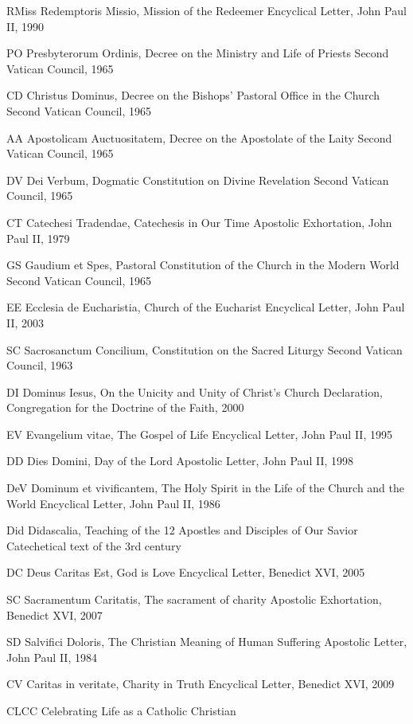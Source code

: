 \documentclass[oneside]{book}
\begin{document}
RMiss    Redemptoris Missio, Mission of the Redeemer
    Encyclical Letter, John Paul II, 1990

PO    Presbyterorum Ordinis, Decree on the Ministry and Life of Priests
    Second Vatican Council, 1965

CD    Christus Dominus, Decree on the Bishops' Pastoral Office
      in the Church
    Second Vatican Council, 1965

AA    Apostolicam Auctuositatem, Decree on the Apostolate of the Laity
    Second Vatican Council, 1965


DV    Dei Verbum, Dogmatic Constitution on Divine Revelation
    Second Vatican Council, 1965

CT    Catechesi Tradendae, Catechesis in Our Time
    Apostolic Exhortation, John Paul II, 1979

GS    Gaudium et Spes, Pastoral Constitution of the Church
      in the Modern World
    Second Vatican Council, 1965

EE    Ecclesia de Eucharistia, Church of the Eucharist
    Encyclical Letter, John Paul II, 2003

SC    Sacrosanctum Concilium, Constitution on the Sacred Liturgy
    Second Vatican Council, 1963

DI    Dominus Iesus, On the Unicity and Unity of Christ's Church
    Declaration, Congregation for the Doctrine of the Faith, 2000

EV    Evangelium vitae, The Gospel of Life
    Encyclical Letter, John Paul II, 1995

DD    Dies Domini, Day of the Lord
    Apostolic Letter, John Paul II, 1998

DeV    Dominum et vivificantem, The Holy Spirit in the Life of
      the Church and the World
    Encyclical Letter, John Paul II, 1986

Did    Didascalia, Teaching of the 12 Apostles and Disciples of
      Our Savior
    Catechetical text of the 3rd century

DC    Deus Caritas Est, God is Love
    Encyclical Letter, Benedict XVI, 2005

SC    Sacramentum Caritatis, The sacrament of charity
    Apostolic Exhortation, Benedict XVI, 2007

SD    Salvifici Doloris, The Christian Meaning of Human Suffering
    Apostolic Letter, John Paul II, 1984

CV    Caritas in veritate, Charity in Truth
    Encyclical Letter, Benedict XVI, 2009

CLCC        Celebrating Life as a Catholic Christian
\end{document}
